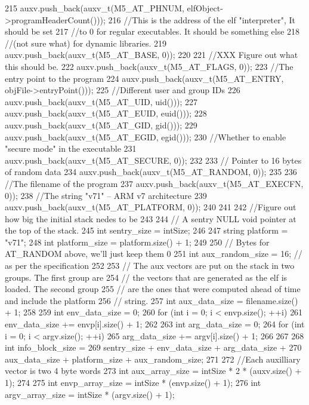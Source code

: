 \begin{DoxyCode}
{{215         auxv.push_back(auxv_t(M5_AT_PHNUM, elfObject->programHeaderCount()));
216         //This is the address of the elf "interpreter", It should be set
217         //to 0 for regular executables. It should be something else
218         //(not sure what) for dynamic libraries.
219         auxv.push_back(auxv_t(M5_AT_BASE, 0));
220 
221         //XXX Figure out what this should be.
222         auxv.push_back(auxv_t(M5_AT_FLAGS, 0));
223         //The entry point to the program
224         auxv.push_back(auxv_t(M5_AT_ENTRY, objFile->entryPoint()));
225         //Different user and group IDs
226         auxv.push_back(auxv_t(M5_AT_UID, uid()));
227         auxv.push_back(auxv_t(M5_AT_EUID, euid()));
228         auxv.push_back(auxv_t(M5_AT_GID, gid()));
229         auxv.push_back(auxv_t(M5_AT_EGID, egid()));
230         //Whether to enable "secure mode" in the executable
231         auxv.push_back(auxv_t(M5_AT_SECURE, 0));
232 
233         // Pointer to 16 bytes of random data
234         auxv.push_back(auxv_t(M5_AT_RANDOM, 0));
235 
236         //The filename of the program
237         auxv.push_back(auxv_t(M5_AT_EXECFN, 0));
238         //The string "v71" -- ARM v7 architecture
239         auxv.push_back(auxv_t(M5_AT_PLATFORM, 0));
240     }
241 
242     //Figure out how big the initial stack nedes to be
243 
244     // A sentry NULL void pointer at the top of the stack.
245     int sentry_size = intSize;
246 
247     string platform = "v71";
248     int platform_size = platform.size() + 1;
249 
250     // Bytes for AT_RANDOM above, we'll just keep them 0
251     int aux_random_size = 16; // as per the specification
252 
253     // The aux vectors are put on the stack in two groups. The first group are
254     // the vectors that are generated as the elf is loaded. The second group
255     // are the ones that were computed ahead of time and include the platform
256     // string.
257     int aux_data_size = filename.size() + 1;
258 
259     int env_data_size = 0;
260     for (int i = 0; i < envp.size(); ++i) {
261         env_data_size += envp[i].size() + 1;
262     }
263     int arg_data_size = 0;
264     for (int i = 0; i < argv.size(); ++i) {
265         arg_data_size += argv[i].size() + 1;
266     }
267 
268     int info_block_size =
269         sentry_size + env_data_size + arg_data_size +
270         aux_data_size + platform_size + aux_random_size;
271 
272     //Each auxilliary vector is two 4 byte words
273     int aux_array_size = intSize * 2 * (auxv.size() + 1);
274 
275     int envp_array_size = intSize * (envp.size() + 1);
276     int argv_array_size = intSize * (argv.size() + 1);
}
\end{DoxyCode}

